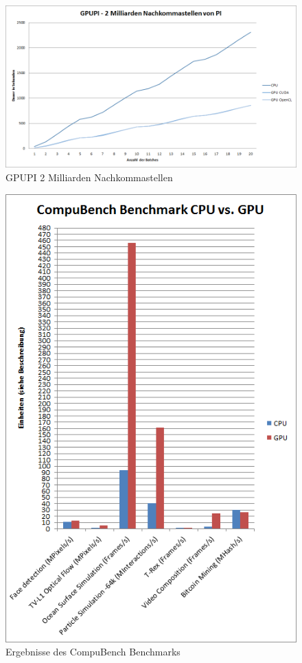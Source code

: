 \begin{figure}[!h]
	\begin{center}
		\includegraphics[width=1.0\linewidth]{images/GPUPI_2B.png}
		\caption{GPUPI 2 Milliarden Nachkommastellen}
		\label{GPUPI_2B}
	\end{center}
\end{figure}

\begin{figure}[!h]
	\begin{center}
		\includegraphics[width=0.8\linewidth]{images/CompuBench.png}
		\caption{Ergebnisse des CompuBench Benchmarks}
		\label{CompuBench}
	\end{center}
\end{figure}


